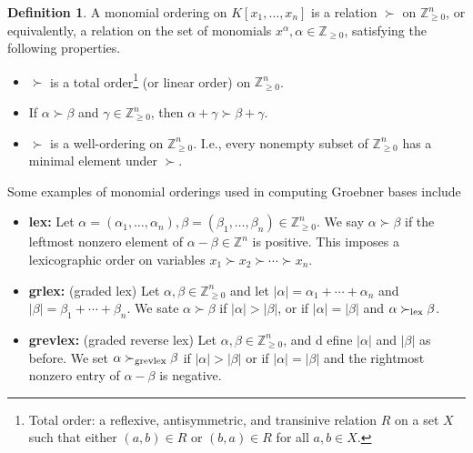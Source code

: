 \documentclass[
]{book}
\providecommand{\tightlist}{%
  \setlength{\itemsep}{0pt}\setlength{\parskip}{0pt}}
\theoremstyle{definition}
\newtheorem{definition}{Definition}[chapter]
\theoremstyle{definition}
\theoremstyle{definition}
\theoremstyle{definition}
\theoremstyle{remark}
\begin{document}
\begin{definition}

A monomial ordering on \(K[x_1, \ldots, x_n]\) is a relation \(\succ\) on \(\mathbb{Z}^n_{\ge 0}\), or
equivalently, a relation on the set of monomials \(x^\alpha, \alpha\in \mathbb{Z}_{\ge 0}\), satisfying the following properties.

\begin{itemize}
\tightlist
\item
  \(\succ\) is a total order\footnote{
  Total order: a reflexive, antisymmetric, and transinive relation $R$ on a set $X$ such that either $(a,b) \in R$ or $(b,a) \in R$ for all $a,b \in X$.
  } (or linear order) on \(\mathbb{Z}^n_{\ge 0}\).
\item
  If \(\alpha \succ \beta\) and \(\gamma \in \mathbb{Z}^n_{\ge 0}\), then \(\alpha + \gamma \succ \beta + \gamma\).
\item
  \(\succ\) is a well-ordering on \(\mathbb{Z}^n_{\ge 0}\).
  I.e., every nonempty subset of \(\mathbb{Z}^n_{\ge 0}\) has a minimal element under \(\succ\).
\end{itemize}

\end{definition}

Some examples of monomial orderings used in computing Groebner bases include

\begin{itemize}
\item
  \textbf{lex:} Let \(\alpha = (\alpha_1, \ldots, \alpha_n), \beta = (\beta_1, \ldots, \beta_n) \in \mathbb{Z}^n_{\ge 0}\). We say \(\alpha \succ \beta\) if the leftmost nonzero element of \(\alpha - \beta \in \mathbb{Z}^n\) is positive. This imposes a lexicographic order on variables \(x_1 \succ x_2 \succ \cdots \succ x_n\).
\item
  \textbf{grlex:} (graded lex) Let \(\alpha, \beta \in \mathbb{Z}^n_{\ge 0}\) and let \(|\alpha| = \alpha_1 + \cdots + \alpha_n\) and \(|\beta| = \beta_1 + \cdots + \beta_n\). We sate \(\alpha \succ \beta\) if \(|\alpha| > |\beta|\), or if \(|\alpha| = |\beta|\) and \(\alpha \succ_{\rm{lex}} \beta\).
\item
  \textbf{grevlex:} (graded reverse lex) Let \(\alpha, \beta \in \mathbb{Z}^n_{\ge 0}\), and d efine \(|\alpha|\) and \(|\beta|\) as before. We set \(\alpha \succ_{\rm{grevlex}} \beta\) if \(|\alpha| > |\beta|\) or if \(|\alpha| = |\beta|\) and the rightmost nonzero entry of \(\alpha - \beta\) is negative.
\end{itemize}
\end{document}
